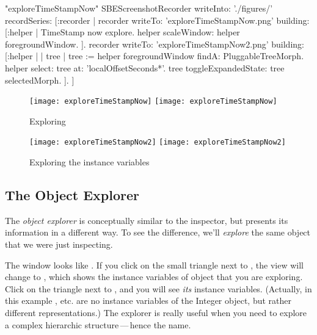 \documentclass[a4paper,10pt,twoside]{book}
\begin{document}
\begin{ExecuteSmalltalkScript}"exploreTimeStampNow"
SBEScreenshotRecorder writeInto: './figures/' recordSeries: [:recorder |
	recorder writeTo: 'exploreTimeStampNow.png' building: [:helper |
		TimeStamp now explore.
		helper scaleWindow: helper foregroundWindow.
	].
	recorder writeTo: 'exploreTimeStampNow2.png' building: [:helper |
		| tree |
		tree := helper foregroundWindow findA: PluggableTreeMorph.
		helper
			select: tree
			at: 'localOffsetSeconds*'.
		tree toggleExpandedState: tree selectedMorph.
	].
]
\end{ExecuteSmalltalkScript}
\begin{figure}[tbp]
\begin{minipage}{0.48\textwidth}
	\begin{center}
	\ifluluelse
		{\texttt{[image: exploreTimeStampNow]}}
		{\texttt{[image: exploreTimeStampNow]}}
	\end{center}
	\caption{Exploring }
	\label{fig:exploreTimeStampNow}
\end{minipage}
\hfill
\begin{minipage}{0.48\textwidth}
	\begin{center}
	\ifluluelse
		{\texttt{[image: exploreTimeStampNow2]}}
		{\texttt{[image: exploreTimeStampNow2]}}
	\end{center}
	\caption{Exploring the instance variables}
	\label{fig:exploreTimeStampNow2}
\end{minipage}
\end{figure}

\subsection{The Object Explorer}

The \emph{object explorer} is conceptually similar to the inspector, but presents its information in a different way.
To see the difference, we'll \emph{explore} the same object that we were just inspecting.

The  window looks like .
If you click on the small triangle next to , the view will change to , which shows the instance variables of object that you are exploring.
Click on the triangle next to , and you will see \emph{its} instance variables. (Actually, in this example ,  etc. are no instance variables of the Integer object, but rather different representations.)  
The explorer is really useful when you need to explore a complex hierarchic structure\,---\,hence the name.
\end{document}
